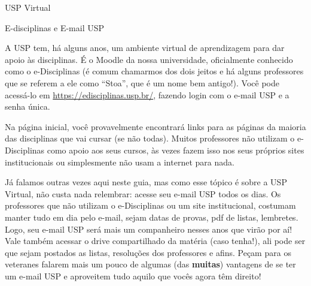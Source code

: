 \begin{secao}{USP Virtual}
%
%
%
\begin{subsecao}{E-disciplinas e E-mail USP}

A USP tem, há alguns anos, um ambiente virtual de aprendizagem para dar apoio
às disciplinas. É o Moodle da nossa universidade, oficialmente conhecido como
o e-Disciplinas (é comum chamarmos dos dois jeitos e há alguns professores que
se referem a ele como ``Stoa'', que é um nome bem antigo!). Você pode acessá-lo em
\url{https://edisciplinas.usp.br/}, fazendo login com o e-mail USP e a senha única.

Na página inicial, você provavelmente encontrará links para as páginas da maioria
das disciplinas que vai cursar (se não todas). Muitos professores não utilizam o 
e-Disciplinas como apoio aos seus cursos, às vezes fazem isso nos seus próprios 
sites institucionais ou simplesmente não usam a internet para nada. 

Já falamos outras vezes aqui neste guia, mas como esse tópico é sobre a USP Virtual,
não custa nada relembrar: acesse seu e-mail USP todos os dias. Os professores que não 
utilizam o e-Disciplinas ou um site institucional, costumam manter tudo em dia pelo 
e-mail, sejam datas de provas, pdf de listas, lembretes. Logo, seu e-mail USP será mais 
um companheiro nesses anos que virão por aí! Vale também acessar o drive compartilhado 
da matéria (caso tenha!), ali pode ser que sejam postados as listas, resoluções dos 
professores e afins. Peçam para os veteranes falarem mais um pouco de algumas 
(das \textbf{muitas}) vantagens de se ter um e-mail USP e aproveitem tudo aquilo que 
vocês agora têm direito!


\end{subsecao}
\end{secao}
